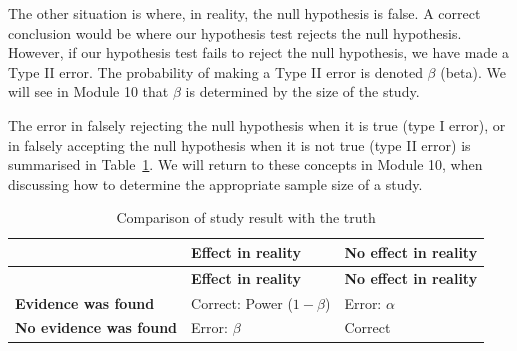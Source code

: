 \documentclass[
  a4paper,
]{memoir}
\begin{document}
The other situation is where, in reality, the null hypothesis is false.
A correct conclusion would be where our hypothesis test rejects the null
hypothesis. However, if our hypothesis test fails to reject the null
hypothesis, we have made a Type II error. The probability of making a
Type II error is denoted \(\beta\) (beta). We will see in Module 10 that
\(\beta\) is determined by the size of the study.

The error in falsely rejecting the null hypothesis when it is true (type
I error), or in falsely accepting the null hypothesis when it is not
true (type II error) is summarised in Table~\ref{tbl-mod4-alpha-beta}.
We will return to these concepts in Module 10, when discussing how to
determine the appropriate sample size of a study.

\begin{longtable}[]{@{}
  >{\raggedright\arraybackslash}p{}
  >{\centering\arraybackslash}p{}
  >{\centering\arraybackslash}p{}@{}}
\caption{Comparison of study result with the
truth}\label{tbl-mod4-alpha-beta}\tabularnewline
\toprule\noalign{}
\begin{minipage}[b]{\linewidth}\raggedright
\end{minipage} & \begin{minipage}[b]{\linewidth}\centering
\textbf{Effect in reality}
\end{minipage} & \begin{minipage}[b]{\linewidth}\centering
\textbf{No effect in reality}
\end{minipage} \\
\midrule\noalign{}
\endfirsthead
\toprule\noalign{}
\begin{minipage}[b]{\linewidth}\raggedright
\end{minipage} & \begin{minipage}[b]{\linewidth}\centering
\textbf{Effect in reality}
\end{minipage} & \begin{minipage}[b]{\linewidth}\centering
\textbf{No effect in reality}
\end{minipage} \\
\midrule\noalign{}
\endhead
\bottomrule\noalign{}
\endlastfoot
\textbf{Evidence was found} & Correct: Power (\(1 - \beta\)) & Error:
\(\alpha\) \\
\textbf{No evidence was found} & Error: \(\beta\) & Correct \\
\end{longtable}
\end{document}
